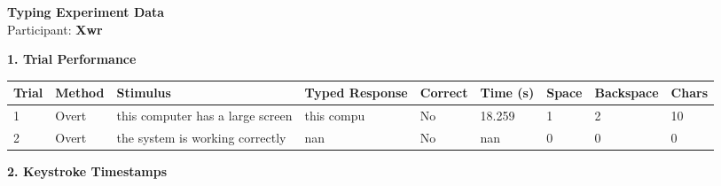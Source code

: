 \documentclass[10pt,a4paper]{article}
\begin{document}

\begin{center}
    {\Large\bfseries Typing Experiment Data}\\
    \vspace{2pt}
    Participant: \textbf{Xwr}
\end{center}

\vspace{0.25cm}


\noindent
{\large\bfseries 1. Trial Performance}

\vspace{0.08cm}

\begin{center}
\begin{tabularx}{\textwidth}{
    C{0.45in}
    C{0.65in}
    L{2.35in}
    L{2.55in}
    C{0.65in}
    C{0.65in}
    C{0.55in}
    C{0.75in}
    C{0.55in}
}
\toprule

\textbf{Trial} &
\textbf{Method} &
\textbf{Stimulus} &
\textbf{Typed Response} &
\textbf{Correct} &
\textbf{Time (s)} &
\textbf{Space} &
\textbf{Backspace} &
\textbf{Chars}
\\

\midrule

1 &
Overt &
this computer has a large screen &
this compu &
No &
18.259 &
1 &
2 &
10
\\

2 &
Overt &
the system is working correctly &
nan &
No &
nan &
0 &
0 &
0
\\

\bottomrule
\end{tabularx}
\end{center}

\vspace{0.35cm}


\noindent
{\large\bfseries 2. Keystroke Timestamps}

\vspace{0.08cm}
\end{document}

